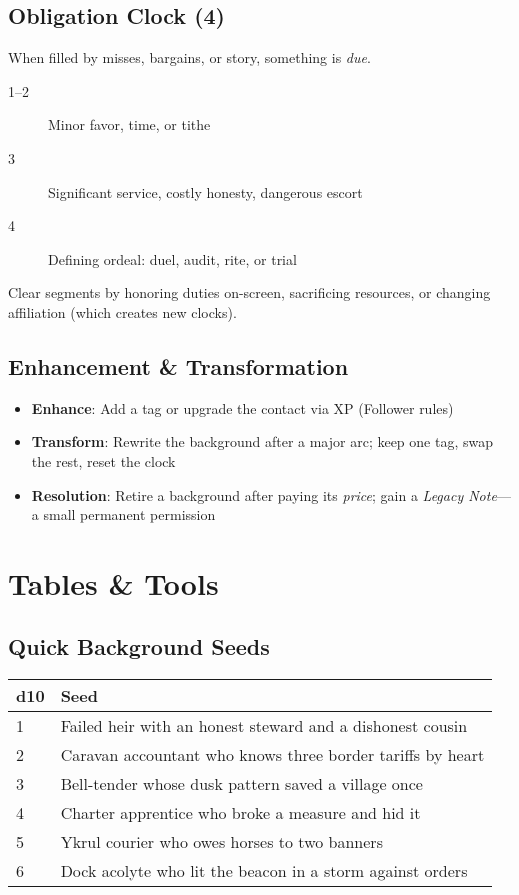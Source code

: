 \subsection*{Obligation Clock (4)}
When filled by misses, bargains, or story, something is \emph{due}.
\begin{description}
\item[1--2] Minor favor, time, or tithe
\item[3] Significant service, costly honesty, dangerous escort
\item[4] Defining ordeal: duel, audit, rite, or trial
\end{description}
Clear segments by honoring duties on-screen, sacrificing resources, or changing affiliation (which creates new clocks).

\subsection*{Enhancement \& Transformation}
\begin{itemize}
\item \textbf{Enhance}: Add a tag or upgrade the contact via XP (Follower rules)
\item \textbf{Transform}: Rewrite the background after a major arc; keep one tag, swap the rest, reset the clock
\item \textbf{Resolution}: Retire a background after paying its \emph{price}; gain a \emph{Legacy Note}—a small permanent permission
\end{itemize}

\section{Tables \& Tools}

\subsection*{Quick Background Seeds}
\small
\begin{tabular}{ll}
\toprule
d10 & Seed \\
\midrule
1 & Failed heir with an honest steward and a dishonest cousin \\
2 & Caravan accountant who knows three border tariffs by heart \\
3 & Bell-tender whose dusk pattern saved a village once \\
4 & Charter apprentice who broke a measure and hid it \\
5 & Ykrul courier who owes horses to two banners \\
6 & Dock acolyte who lit the beacon in a storm against orders \\
\bottomrule
\end{tabular}
\normalsize

